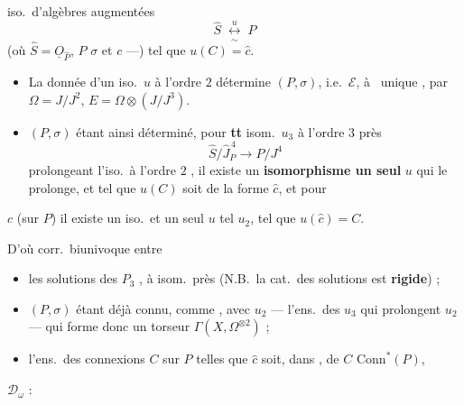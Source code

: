 \documentclass[11pt,a4paper]{article}
\begin{document}
\ill{} iso.\ d'algèbres augmentées
\[
  \widehat{S} \;\underset{\sim}{\overset{u}{\longleftrightarrow}}\; P
\]
 (où $\widehat{S} = \underline{O}_{\widehat{P}}$, $P$ \ill{}
$\sigma$ et $c$ ---) tel que $u(C) = \hat{c}$.

\begin{itemize}
  \item[a)] La donnée d'un iso.\ $u$ à l'ordre $2$ détermine $(P,\sigma)$,
  i.e.\ $\mathcal{E}$, à \ unique , par
  $\Omega = J/J^2$, $E = \Omega \otimes (J/J^3)$.
  \item[b)] $(P,\sigma)$ étant ainsi déterminé, pour \textbf{tt} isom.\ $u_3$
  à l'ordre $3$ près
  \[
    \widehat{S}/\widehat{J}^{\,4}_P \longrightarrow P/J^4
  \]
  prolongeant l'iso.\ à l'ordre $2$ \ill{}, il existe un \textbf{isomorphisme
  \ill{} un seul} $u$ qui le prolonge, et tel que $u(C)$ soit de la forme
  $\hat{c}$, et pour \ill{}
\end{itemize}

$c$ (sur $P$) il existe un iso.\ et un seul $u$ tel
 $u_2$, tel que $u(\hat{c}) = C$.

D'où corr.\ biunivoque entre
\begin{itemize}
  \item[a)] les solutions des $P_3$ , à isom.\ près
  (N.B.\ la cat.\ des solutions est \textbf{rigide}) ;
  \item[b)] $(P,\sigma)$ étant déjà connu, comme \ill{}, avec $u_2$ ---
  l'ens.\ des $u_3$ qui prolongent $u_2$ --- qui forme donc un
  torseur \ill{} $\Gamma(X, \Omega^{\otimes 2})$ ;
  \item[c)] l'ens.\ des connexions $C$ sur $P$ telles que $\hat{c}$ soit,
  dans \ill{},  de $C$ \ill{} 
  $\mathrm{Conn}^{*}(P)$, \struck{\ill{}}
\end{itemize}


$\mathcal{D}_\omega$ : \ill{}

\end{document}
